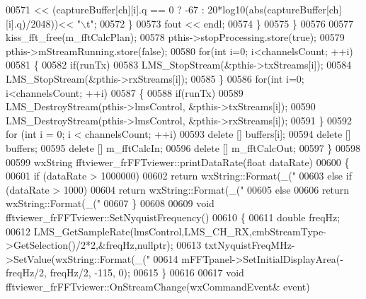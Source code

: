 \begin{DoxyCode}
{{{00571                 << (captureBuffer[ch][i].q == 0 ? -67 : 20*log10(abs(captureBuffer[ch][i].q)/2048))<< \textcolor{stringliteral}{"\(\backslash\)t"};
00572             \}
00573             fout << endl;
00574         \}
00575     \}
00576 
00577     kiss\_fft\_free(m\_fftCalcPlan);
00578     pthis->stopProcessing.store(\textcolor{keyword}{true});
00579     pthis->mStreamRunning.store(\textcolor{keyword}{false});
00580     \textcolor{keywordflow}{for}(\textcolor{keywordtype}{int} i=0; i<channelsCount; ++i)
00581     \{
00582         \textcolor{keywordflow}{if}(runTx)
00583             LMS_StopStream(&pthis->txStreams[i]);
00584         LMS_StopStream(&pthis->rxStreams[i]);
00585     \}
00586     \textcolor{keywordflow}{for}(\textcolor{keywordtype}{int} i=0; i<channelsCount; ++i)
00587     \{
00588         \textcolor{keywordflow}{if}(runTx)
00589             LMS_DestroyStream(pthis->lmsControl, &pthis->txStreams[i]);
00590         LMS_DestroyStream(pthis->lmsControl, &pthis->rxStreams[i]);
00591     \}
00592     \textcolor{keywordflow}{for} (\textcolor{keywordtype}{int} i = 0; i < channelsCount; ++i)
00593         \textcolor{keyword}{delete} [] buffers[i];
00594     \textcolor{keyword}{delete} [] buffers;
00595     \textcolor{keyword}{delete} [] m\_fftCalcIn;
00596     \textcolor{keyword}{delete} [] m\_fftCalcOut;
00597 \}
00598 
00599 wxString fftviewer_frFFTviewer::printDataRate(\textcolor{keywordtype}{float} dataRate)
00600 \{
00601     \textcolor{keywordflow}{if} (dataRate > 1000000)
00602         \textcolor{keywordflow}{return} wxString::Format(\_(\textcolor{stringliteral}{"%
00603     \textcolor{keywordflow}{else} \textcolor{keywordflow}{if} (dataRate > 1000)
00604         \textcolor{keywordflow}{return} wxString::Format(\_(\textcolor{stringliteral}{"%
00605     \textcolor{keywordflow}{else}
00606         \textcolor{keywordflow}{return} wxString::Format(\_(\textcolor{stringliteral}{"%
00607 \}
00608 
00609 \textcolor{keywordtype}{void} fftviewer_frFFTviewer::SetNyquistFrequency()
00610 \{
00611     \textcolor{keywordtype}{double} freqHz;
00612     LMS_GetSampleRate(lmsControl,LMS_CH_RX,cmbStreamType->GetSelection()/2*2,&freqHz,\textcolor{keyword}{nullptr});
00613     txtNyquistFreqMHz->SetValue(wxString::Format(\_(\textcolor{stringliteral}{"%
00614     mFFTpanel->SetInitialDisplayArea(-freqHz/2, freqHz/2, -115, 0);
00615 \}
00616 
00617 \textcolor{keywordtype}{void} fftviewer_frFFTviewer::OnStreamChange(wxCommandEvent& event)
}}}}}}}
\end{DoxyCode}
